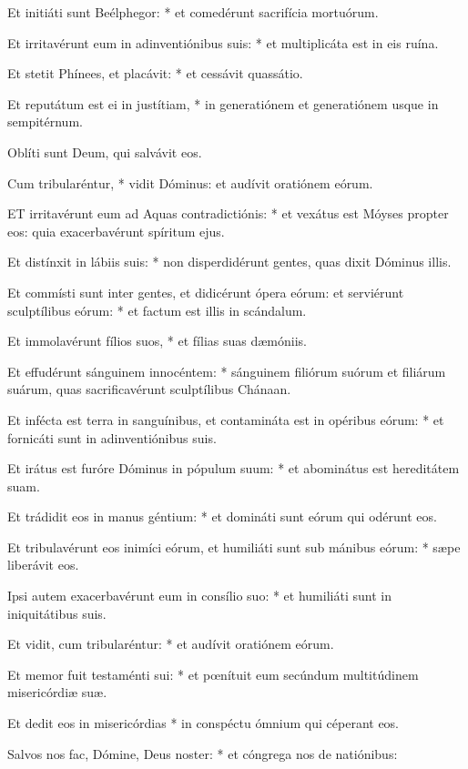 Et initiáti sunt Beélphegor: * et comedérunt sacrifícia mortuórum.

Et irritavérunt eum in adinventiónibus suis: * et multiplicáta est in eis ruína.

Et stetit Phínees, et placávit: * et cessávit quassátio.

Et reputátum est ei in justítiam, * in generatiónem et generatiónem usque in sempitérnum.

 Oblíti sunt Deum, qui salvávit eos.

 Cum tribularéntur, * vidit Dóminus: et audívit oratiónem eórum.


\lettrine[lines=2]{E}{T} irritavérunt eum ad Aquas contradictiónis: * et vexátus est Móyses propter eos: quia exacerbavérunt spíritum ejus.

Et distínxit in lábiis suis: * non disperdidérunt gentes, quas dixit Dóminus illis.

Et commísti sunt inter gentes, et didicérunt ópera eórum: et serviérunt sculptílibus eórum: * et factum est illis in scándalum.

Et immolavérunt fílios suos, * et fílias suas dæmóniis.

Et effudérunt sánguinem innocéntem: * sánguinem filiórum suórum et filiárum suárum, quas sacrificavérunt sculptílibus Chánaan.

Et infécta est terra in sanguínibus, et contamináta est in opéribus eórum: * et fornicáti sunt in adinventiónibus suis.

Et irátus est furóre Dóminus in pópulum suum: * et abominátus est hereditátem suam.

Et trádidit eos in manus géntium: * et domináti sunt eórum qui odérunt eos.

Et tribulavérunt eos inimíci eórum, et humiliáti sunt sub mánibus eórum: * sæpe liberávit eos.

Ipsi autem exacerbavérunt eum in consílio suo: * et humiliáti sunt in iniquitátibus suis.

Et vidit, cum tribularéntur: * et audívit oratiónem eórum.

Et memor fuit testaménti sui: * et pœnítuit eum secúndum multitúdinem misericórdiæ suæ.

Et dedit eos in misericórdias * in conspéctu ómnium qui céperant eos.

Salvos nos fac, Dómine, Deus noster: * et cóngrega nos de natiónibus:

